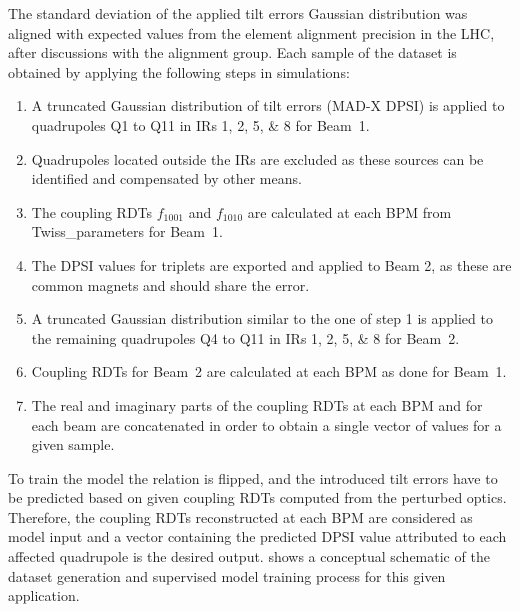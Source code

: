 The standard deviation of the applied tilt errors Gaussian distribution was aligned with expected values from the element alignment precision in the LHC, after discussions with the alignment group.
Each sample of the dataset is obtained by applying the following steps in simulations:
\begin{enumerate}
    \item A truncated Gaussian distribution of tilt errors (MAD-X DPSI) is applied to quadrupoles Q\num{1} to Q\num{11} in IRs \numlist{1;2;5;8} for Beam~\num{1}.
    \item Quadrupoles located outside the IRs are excluded as these sources can be identified and compensated by other means.
    \item The coupling RDTs \(f_{1001}\) and \(f_{1010}\) are calculated at each \acrshort{BPM} from \gls{Twiss_parameters} for Beam~\num{1}.
    \item The DPSI values for triplets are exported and applied to Beam 2, as these are common magnets and should share the error.
    \item A truncated Gaussian distribution similar to the one of step \num{1} is applied to the remaining quadrupoles Q\num{4} to Q\num{11} in IRs \numlist{1;2;5;8} for Beam~\num{2}.
    \item Coupling RDTs for Beam~\num{2} are calculated at each \acrshort{BPM} as done for Beam~\num{1}.
    \item The real and imaginary parts of the coupling RDTs at each BPM and for each beam are concatenated in order to obtain a single vector of values for a given sample.
\end{enumerate}

To train the model the relation is flipped, and the introduced tilt errors have to be predicted based on given coupling RDTs computed from the perturbed optics.
Therefore, the coupling \glspl{RDT} reconstructed at each BPM are considered as model input and a vector containing the predicted DPSI value attributed to each affected quadrupole is the desired output.
 shows a conceptual schematic of the dataset generation and supervised model training process for this given application.

